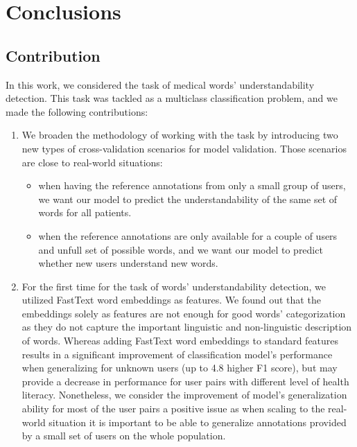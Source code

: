 \chapter{Conclusions}
\label{ch:conclusions}

\section{Contribution}
In this work, we considered the task of medical words' understandability detection. This task was tackled as a multiclass classification problem, and we made the following contributions:

\begin{enumerate}[listparindent=1.5em]
    \item We broaden the methodology of working with the task by introducing two new types of cross-validation scenarios for model validation. Those scenarios are close to real-world situations:
    \begin{itemize}
        \item when having the reference annotations from only a small group of users, we want our model to predict the understandability of the same set of words for all patients. 
        \item when the reference annotations are only available for a couple of users and unfull set of possible words, and we want our model to predict whether new users understand new words.
    \end{itemize}
    
    \item For the first time for the task of words' understandability detection, we utilized FastText word embeddings as features. We found out that the embeddings solely as features are not enough for good words' categorization as they do not capture the important linguistic and non-linguistic description of words. Whereas adding FastText word embeddings to standard features results in a significant improvement of classification model's performance when generalizing for unknown users (up to 4.8 higher F1 score), but may provide a decrease in performance for user pairs with different level of health literacy. Nonetheless, we consider the improvement of model's generalization ability for most of the user pairs a positive issue as when scaling to the real-world situation it is important to be able to generalize annotations provided by a small set of users on the whole population.
    

\end{enumerate}
